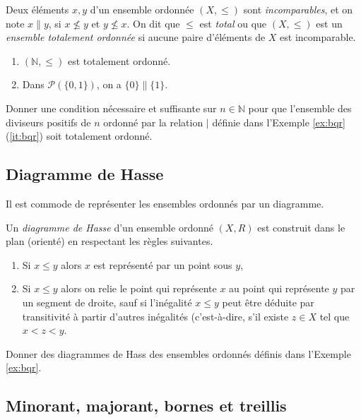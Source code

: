 \documentclass[french,course,oneside,theoremnosection]{lecture}
\newcommand{\N}{\mathbb{N}}
\newcommand{\inco}{\parallel}
\begin{document}
\begin{definition}
Deux éléments $x,y$ d'un ensemble ordonnée $(X,\leq)$ sont \emph{incomparables}, et on note $x \parallel y$, si $x\not\leq y$ et $y\not\leq x$. On dit que $\leq$ est \emph{total} ou que $(X,\leq)$ est un \emph{ensemble totalement ordonnée} si aucune paire d'éléments de $X$ est incomparable.
\end{definition}
\begin{example}
\begin{enumerate}
\item $(\N, \leq)$ est totalement ordonné.
\item Dans $\mathcal{P}(\{0, 1\})$, on a $\{0\}\inco\{1\}$.
\end{enumerate}
\end{example}
\begin{exercise}
Donner une condition nécessaire et suffisante sur $n\in \N$ pour que l'ensemble des diviseurs positifs de $n$ ordonné par la relation $|$ définie dans l'Exemple \ref{ex:bqr} (\ref{it:bqr}) soit totalement ordonné.
\end{exercise}

\subsection{Diagramme de Hasse}

Il est commode de représenter les ensembles ordonnés par un diagramme.

\begin{definition}
Un \emph{diagramme de Hasse} d'un ensemble ordonné $(X,R)$ est construit dans le plan (orienté) en respectant les règles suivantes.
\begin{enumerate}
\item Si $x\leq y$ alors $x$ est représenté par un point sous $y$,
\item Si $x\leq y$ alors on relie le point qui représente $x$ au point qui représente $y$ par un segment de droite, sauf si l'inégalité $x\leq y$ peut être déduite par transitivité à partir d'autres inégalités (c'est-à-dire, s'il existe $z\in X$ tel que $x<z<y$.
\end{enumerate}
\end{definition}
\begin{example}
Donner des diagrammes de Hass  des ensembles ordonnés définis dans l'Exemple \ref{ex:bqr}.
\end{example}

\subsection{Minorant, majorant, bornes et treillis}
\end{document}

